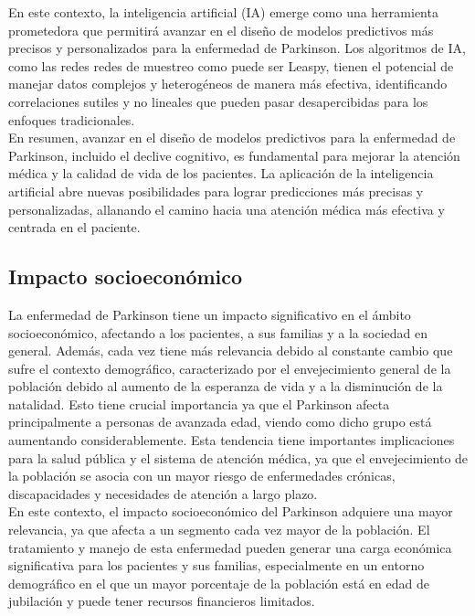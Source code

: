 En este contexto, la inteligencia artificial (IA) emerge como una herramienta prometedora que permitirá avanzar en el diseño de modelos predictivos más precisos y personalizados para la enfermedad de Parkinson. Los algoritmos de IA, como las redes redes de muestreo como puede ser Leaspy,
tienen el potencial de manejar datos complejos y heterogéneos de manera más efectiva, identificando
correlaciones sutiles y no lineales que pueden pasar desapercibidas para los enfoques tradicionales.\\

En resumen, avanzar en el diseño de modelos predictivos para la enfermedad de Parkinson, incluido el
declive cognitivo, es fundamental para mejorar la atención médica y la calidad de vida de los pacientes.
La aplicación de la inteligencia artificial abre nuevas posibilidades para lograr predicciones más precisas
y personalizadas, allanando el camino hacia una atención médica más efectiva y centrada en el paciente.\\

\subsection{Impacto socioeconómico}
La enfermedad de Parkinson tiene un impacto significativo en el ámbito socioeconómico, afectando a los pacientes, a sus familias y a la sociedad en general. Además, cada vez tiene más relevancia debido al constante cambio que sufre el contexto demográfico, caracterizado por el envejecimiento general de la población debido al aumento de la esperanza de vida y a la disminución de la natalidad. Esto tiene crucial importancia ya que el Parkinson afecta principalmente a personas de avanzada edad, viendo como dicho grupo está aumentando considerablemente. Esta tendencia tiene importantes implicaciones para la salud pública y el sistema de atención médica, ya que el envejecimiento de la población se asocia con un mayor riesgo de enfermedades crónicas, discapacidades y necesidades de atención a largo plazo. \cite{GARCIARAMOS2016401}\\

En este contexto, el impacto socioeconómico del Parkinson adquiere una mayor relevancia, ya que afecta a un segmento cada vez mayor de la población. El tratamiento y manejo de esta enfermedad pueden generar una carga económica significativa para los pacientes y sus familias, especialmente en un entorno demográfico en el que un mayor porcentaje de la población está en edad de jubilación y puede tener recursos financieros limitados.\\

